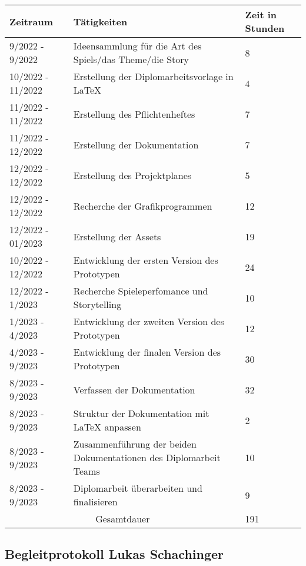 \begin{tabular}{|m{}|m{}|m{}|}
    \hline
    \cellcolor{gray!10} Zeitraum & \cellcolor{gray!10} Tätigkeiten & \cellcolor{gray!10} Zeit in Stunden \\
    \hline
    9/2022 - 9/2022 & Ideensammlung für die Art des Spiels/das Theme/die Story & 8 \\
    \hline
    10/2022 - 11/2022 & Erstellung der Diplomarbeitsvorlage in LaTeX & 4 \\
    \hline
    11/2022 - 11/2022 & Erstellung des Pflichtenheftes & 7 \\
    \hline
    11/2022 - 12/2022 & Erstellung der Dokumentation & 7 \\
    \hline
    12/2022 - 12/2022 & Erstellung des Projektplanes & 5 \\
    \hline
    12/2022 - 12/2022 & Recherche der Grafikprogrammen & 12 \\
    \hline
    12/2022 - 01/2023 & Erstellung der Assets & 19 \\
    \hline
    10/2022 - 12/2022 & Entwicklung der ersten Version des Prototypen & 24 \\
    \hline
    12/2022 - 1/2023 & Recherche Spieleperfomance und Storytelling & 10 \\
    \hline
    1/2023 - 4/2023 & Entwicklung der zweiten Version des Prototypen & 12 \\
    \hline
    4/2023 - 9/2023 & Entwicklung der finalen Version des Prototypen & 30 \\
    \hline
    8/2023 - 9/2023 & Verfassen der Dokumentation & 32 \\
    \hline
    8/2023 - 9/2023 & Struktur der Dokumentation mit LaTeX anpassen & 2 \\
    \hline
    8/2023 - 9/2023 & Zusammenführung der beiden Dokumentationen des Diplomarbeit Teams & 10 \\
    \hline
    8/2023 - 9/2023 & Diplomarbeit überarbeiten und finalisieren & 9 \\
    \hline
    \multicolumn{2}{|c|}{\cellcolor{gray!30}Gesamtdauer} & 191 \\
    \hline
\end{tabular}


\pagebreak

\subsection{Begleitprotokoll Lukas Schachinger}


